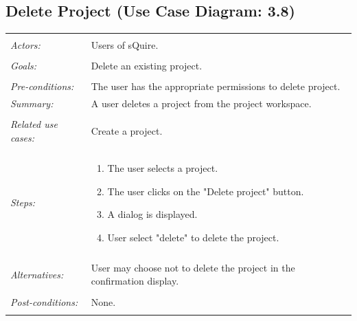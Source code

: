 \documentclass[11pt]{report}
\begin{document}
\subsection{Delete Project (Use Case Diagram: 3.8)}
\begin{tabular}{ p{2cm} p{12cm} }
\hline
\\
\textit{Actors:} & Users of sQuire.\\
\\
\textit{Goals:} & Delete an existing project. \\
\\
\textit{Pre-conditions:} & The user has the appropriate permissions to delete project. 
\\
\textit{Summary:} & A user deletes a project from the project workspace.\\
\\
\textit{Related use cases:} & Create a project. \\
\\
\textit{Steps:} & \begin{enumerate}
 \item The user selects a project.
 \item The user clicks on the "Delete project" button. 
 \item A dialog is displayed. 
 \item User select "delete" to delete the project. 
 \end{enumerate}\\
 \\
 \textit{Alternatives:} & User may choose not to delete the project in the confirmation display.\\
 \\
 \textit{Post-conditions:} & None. \\
 \\
\hline
\end{tabular}
\end{document}
